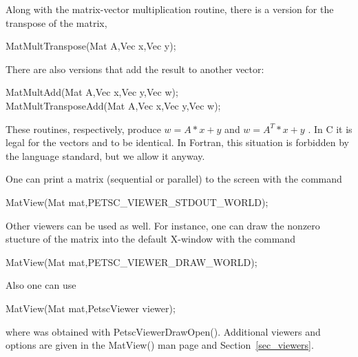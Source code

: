 Along with the matrix-vector multiplication routine, there is 
a version for the transpose of the matrix, 
\begin{tabbing}
  MatMultTranspose(Mat A,Vec x,Vec y);
\end{tabbing}
There are also versions that add the result
to another vector:  
\begin{tabbing}
  MatMultAdd(Mat A,Vec x,Vec y,Vec w);\\
  MatMultTransposeAdd(Mat A,Vec x,Vec y,Vec w);
\end{tabbing}
These routines, respectively, produce $ w = A*x + y $ and $ w = A^{T}*x + y$ . 
In C it is legal for the vectors  and  to be identical.
In Fortran, this situation is forbidden by the language standard, 
but we allow it anyway.

One can print a matrix (sequential or parallel) to the screen with the 
command 
\begin{tabbing}
  MatView(Mat mat,PETSC\_VIEWER\_STDOUT\_WORLD);
\end{tabbing}
Other viewers can be used as well. For instance, one can draw the
nonzero stucture of the matrix into the default X-window with the 
command 
\begin{tabbing}
  MatView(Mat mat,PETSC\_VIEWER\_DRAW\_WORLD);
\end{tabbing}
Also one can use 
\begin{tabbing}
  MatView(Mat mat,PetscViewer viewer);
\end{tabbing}
where  was obtained with PetscViewerDrawOpen().
Additional viewers  and options are given in the MatView() man
page and Section~\ref{sec_viewers}.

